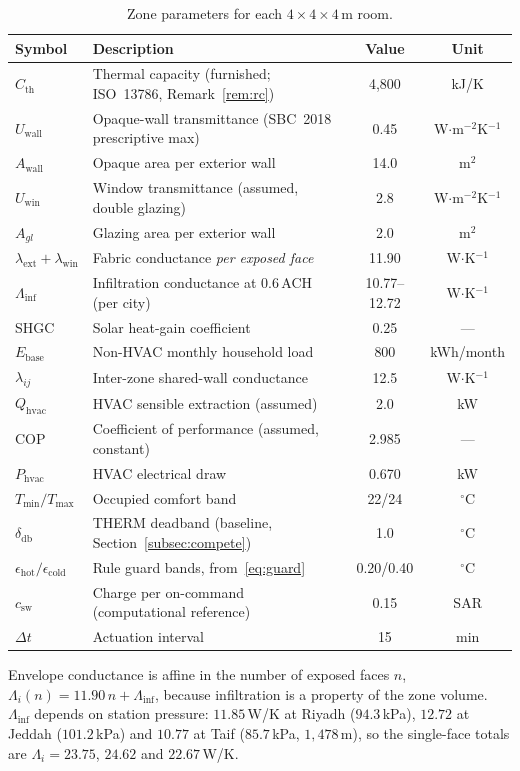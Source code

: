 \documentclass[pdflatex,sn-mathphys-num,iicol]{sn-jnl}
\theoremstyle{thmstyleone}\newtheorem{proposition}{Proposition}\newtheorem{corollary}{Corollary}
\theoremstyle{thmstyletwo}\newtheorem{remark}{Remark}\newtheorem{observation}{Observation}
\theoremstyle{thmstylethree}\newtheorem{definition}{Definition}
\newcommand{\Tmin}{T_{\min}}
\newcommand{\Tmax}{T_{\max}}
\newcommand{\deadband}{\delta_{\mathrm{db}}}
\newcommand{\Cth}{C_{\mathrm{th}}}
\newcommand{\lext}{\lambda_{\mathrm{ext}}}
\newcommand{\lwin}{\lambda_{\mathrm{win}}}
\newcommand{\lij}{\lambda_{ij}}
\newcommand{\Qhvac}{Q_{\mathrm{hvac}}}
\newcommand{\csw}{c_{\mathrm{sw}}}
\newcommand{\Phvac}{P_{\mathrm{hvac}}}
\begin{document}
\begin{table}[t]
\centering
\caption{Zone parameters for each $4\times4\times4\,\text{m}$ room.}
\label{tab:params}
\setlength{\tabcolsep}{4.5pt}
\begin{tabularx}{\linewidth}{lXcc}
\toprule
Symbol & Description & Value & Unit \\
\midrule
$\Cth$   & Thermal capacity (furnished; ISO~13786, Remark~\ref{rem:rc}) & 4{,}800 & kJ/K\\
$U_{\mathrm{wall}}$ & Opaque-wall transmittance (SBC~2018 prescriptive max) & 0.45 & W$\cdot$m$^{-2}$K$^{-1}$ \\
$A_{\mathrm{wall}}$ & Opaque area per exterior wall & 14.0 & m$^2$ \\
$U_{\mathrm{win}}$ & Window transmittance (assumed, double glazing) & 2.8 & W$\cdot$m$^{-2}$K$^{-1}$ \\
$A_{gl}$ & Glazing area per exterior wall            & 2.0 & m$^2$ \\
$\lext+\lwin$ & Fabric conductance \emph{per exposed face} & 11.90 & W$\cdot$K$^{-1}$ \\
$\Lambda_{\mathrm{inf}}$ & Infiltration conductance at $0.6\,$ACH (per city) & 10.77--12.72 & W$\cdot$K$^{-1}$ \\
SHGC     & Solar heat-gain coefficient               & 0.25 & --- \\
$E_{\mathrm{base}}$ & Non-HVAC monthly household load  & 800 & kWh/month \\
$\lij$   & Inter-zone shared-wall conductance         & 12.5 & W$\cdot$K$^{-1}$ \\
$\Qhvac$ & HVAC sensible extraction (assumed)        &  2.0 & kW \\
COP      & Coefficient of performance (assumed, constant) & 2.985 & --- \\
$\Phvac$ & HVAC electrical draw                       & 0.670 & kW \\
$\Tmin/\Tmax$ & Occupied comfort band                & 22/24 & $^\circ$C \\
$\deadband$ & THERM deadband (baseline, Section~\ref{subsec:compete}) & 1.0 & $^\circ$C \\
$\epsilon_{\mathrm{hot}}/\epsilon_{\mathrm{cold}}$ & Rule guard bands, from~\eqref{eq:guard} & 0.20/0.40 & $^\circ$C \\
$\csw$       & Charge per on-command (computational reference) & 0.15 & SAR \\
$\Delta t$  & Actuation interval                      &   15 & min \\
\bottomrule
\end{tabularx}
\vspace{2pt}
{\footnotesize\raggedright
Envelope conductance is affine in the number of exposed faces $n$,
$\Lambda_i(n)=11.90\,n+\Lambda_{\mathrm{inf}}$, because infiltration is a
property of the zone volume. $\Lambda_{\mathrm{inf}}$ depends on station
pressure: $11.85\,$W/K at Riyadh ($94.3\,$kPa), $12.72$ at Jeddah
($101.2\,$kPa) and $10.77$ at Taif ($85.7\,$kPa, $1{,}478\,$m), so the
single-face totals are $\Lambda_i=23.75$, $24.62$ and $22.67\,$W/K.\par}
\end{table}
\end{document}
